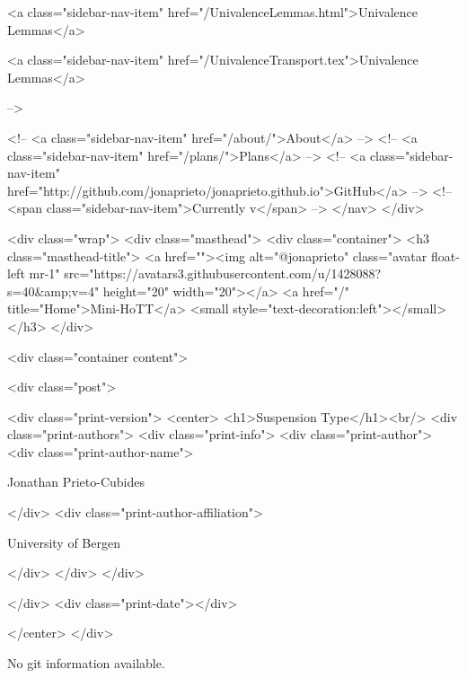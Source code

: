       
    
      
        
          <a class="sidebar-nav-item" href="/UnivalenceLemmas.html">Univalence Lemmas</a>
        
      
    
      
        
          <a class="sidebar-nav-item" href="/UnivalenceTransport.tex">Univalence Lemmas</a>
        
      
     -->

    <!-- <a class="sidebar-nav-item" href="/about/">About</a> -->
    <!-- <a class="sidebar-nav-item" href="/plans/">Plans</a> -->
    <!-- <a class="sidebar-nav-item" href="http://github.com/jonaprieto/jonaprieto.github.io">GitHub</a> -->
    <!-- <span class="sidebar-nav-item">Currently v</span> -->
  </nav>
</div>

    <div class="wrap">
      <div class="masthead">
        <div class="container">
          <h3 class="masthead-title">
            <a href=""><img alt="@jonaprieto" class="avatar float-left mr-1" src="https://avatars3.githubusercontent.com/u/1428088?s=40&amp;v=4" height="20" width="20"></a>
            <a href="/" title="Home">Mini-HoTT</a>
            <small style="text-decoration:left"></small>
          </h3>
        </div>
      
      <div class="container content">
        







<div class="post">

  <div class="print-version">
    <center>
      <h1>Suspension Type</h1><br/>
        <div class="print-authors">
          <div class="print-info">
            <div class="print-author">
              <div class="print-author-name">
                
                  Jonathan Prieto-Cubides
                
              </div>
              <div class="print-author-affiliation">
                
                  University of Bergen
                
                </div>
            </div>
          </div>
          
          
        </div>
        <div class="print-date"></div>
        
        
    </center>
  </div>

  
  No git information available.
  
